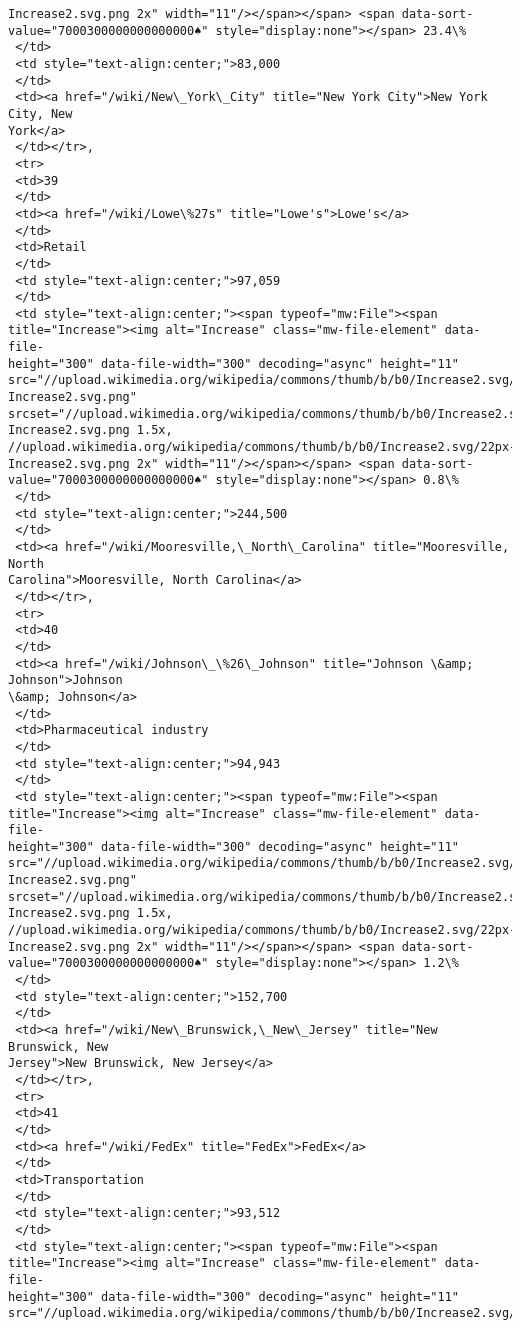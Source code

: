 \documentclass[11pt]{article}
\begin{document}
\begin{tcolorbox}[breakable, size=fbox, boxrule=.5pt, pad at break*=1mm, opacityfill=0]
\begin{Verbatim}[commandchars=\\\{\}]
Increase2.svg.png 2x" width="11"/></span></span> <span data-sort-
value="7000300000000000000♠" style="display:none"></span> 23.4\%
 </td>
 <td style="text-align:center;">83,000
 </td>
 <td><a href="/wiki/New\_York\_City" title="New York City">New York City, New
York</a>
 </td></tr>,
 <tr>
 <td>39
 </td>
 <td><a href="/wiki/Lowe\%27s" title="Lowe's">Lowe's</a>
 </td>
 <td>Retail
 </td>
 <td style="text-align:center;">97,059
 </td>
 <td style="text-align:center;"><span typeof="mw:File"><span
title="Increase"><img alt="Increase" class="mw-file-element" data-file-
height="300" data-file-width="300" decoding="async" height="11"
src="//upload.wikimedia.org/wikipedia/commons/thumb/b/b0/Increase2.svg/11px-
Increase2.svg.png"
srcset="//upload.wikimedia.org/wikipedia/commons/thumb/b/b0/Increase2.svg/17px-
Increase2.svg.png 1.5x,
//upload.wikimedia.org/wikipedia/commons/thumb/b/b0/Increase2.svg/22px-
Increase2.svg.png 2x" width="11"/></span></span> <span data-sort-
value="7000300000000000000♠" style="display:none"></span> 0.8\%
 </td>
 <td style="text-align:center;">244,500
 </td>
 <td><a href="/wiki/Mooresville,\_North\_Carolina" title="Mooresville, North
Carolina">Mooresville, North Carolina</a>
 </td></tr>,
 <tr>
 <td>40
 </td>
 <td><a href="/wiki/Johnson\_\%26\_Johnson" title="Johnson \&amp; Johnson">Johnson
\&amp; Johnson</a>
 </td>
 <td>Pharmaceutical industry
 </td>
 <td style="text-align:center;">94,943
 </td>
 <td style="text-align:center;"><span typeof="mw:File"><span
title="Increase"><img alt="Increase" class="mw-file-element" data-file-
height="300" data-file-width="300" decoding="async" height="11"
src="//upload.wikimedia.org/wikipedia/commons/thumb/b/b0/Increase2.svg/11px-
Increase2.svg.png"
srcset="//upload.wikimedia.org/wikipedia/commons/thumb/b/b0/Increase2.svg/17px-
Increase2.svg.png 1.5x,
//upload.wikimedia.org/wikipedia/commons/thumb/b/b0/Increase2.svg/22px-
Increase2.svg.png 2x" width="11"/></span></span> <span data-sort-
value="7000300000000000000♠" style="display:none"></span> 1.2\%
 </td>
 <td style="text-align:center;">152,700
 </td>
 <td><a href="/wiki/New\_Brunswick,\_New\_Jersey" title="New Brunswick, New
Jersey">New Brunswick, New Jersey</a>
 </td></tr>,
 <tr>
 <td>41
 </td>
 <td><a href="/wiki/FedEx" title="FedEx">FedEx</a>
 </td>
 <td>Transportation
 </td>
 <td style="text-align:center;">93,512
 </td>
 <td style="text-align:center;"><span typeof="mw:File"><span
title="Increase"><img alt="Increase" class="mw-file-element" data-file-
height="300" data-file-width="300" decoding="async" height="11"
src="//upload.wikimedia.org/wikipedia/commons/thumb/b/b0/Increase2.svg/11px-

\end{Verbatim}
\end{tcolorbox}
\end{document}
